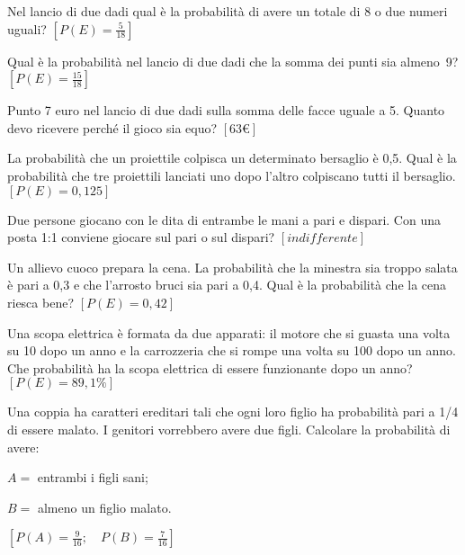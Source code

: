 \begin{esercizio}[\Ast]
 \label{ese:9.48}
Nel lancio di due dadi qual è la probabilità di avere un totale di 8 o due 
numeri uguali?
\hfill $\left[P(E)=\frac 5{18}\right]$
\end{esercizio}

\begin{esercizio}[\Ast]
 \label{ese:9.49}
Qual è la probabilità nel lancio di due dadi che la somma dei punti sia 
almeno~9?
\hfill $\left[P(E)=\frac{15}{18}\right]$
\end{esercizio}

\begin{esercizio}[\Ast]
 \label{ese:9.50}
Punto 7 euro nel lancio di due dadi sulla somma delle facce uguale a 5. Quanto 
devo ricevere perché il gioco sia equo?
\hfill $\left[63\text{€}\right]$
\end{esercizio}

\begin{esercizio}[\Ast]
 \label{ese:9.51}
La probabilità che un proiettile colpisca un determinato bersaglio è 0,5. Qual è 
la probabilità che tre proiettili lanciati uno dopo l'altro colpiscano tutti il 
bersaglio.
\hfill $\left[P(E)=0,125\right]$
\end{esercizio}

\begin{esercizio}[\Ast]
 \label{ese:9.52}
Due persone giocano con le dita di entrambe le mani a pari e dispari. Con una 
posta 1:1 conviene giocare sul pari o sul dispari?
\hfill $\left[indifferente\right]$
\end{esercizio}

\begin{esercizio}[\Ast]
 \label{ese:9.53}
Un allievo cuoco prepara la cena. La probabilità che la minestra sia troppo 
salata è pari a 0,3 e che l'arrosto bruci sia pari a 0,4. Qual è la probabilità 
che la cena riesca bene?
\hfill $\left[P(E)=0,42\right]$
\end{esercizio}

\begin{esercizio}[\Ast]
 \label{ese:9.54}
Una scopa elettrica è formata da due apparati: il motore che si guasta una volta 
su 10 dopo un anno e la carrozzeria che si rompe una volta su 100 dopo un anno. 
Che probabilità ha la scopa elettrica di essere funzionante dopo un anno?
\hfill $\left[P(E)=89,1\%\right]$
\end{esercizio}

\begin{esercizio}[\Ast]
 \label{ese:9.55}
Una coppia ha caratteri ereditari tali che ogni loro figlio ha probabilità pari 
a 1/4 di essere malato. I genitori vorrebbero avere due figli. Calcolare la 
probabilità di avere:
\begin{itemize*}
\item $ A= $ entrambi i figli sani;
\item $ B= $ almeno un figlio malato.
\end{itemize*}
\hfill $\left[P(A)=\frac 9 {16}; \quad P(B)=\frac 7 {16}\right]$
\end{esercizio}

